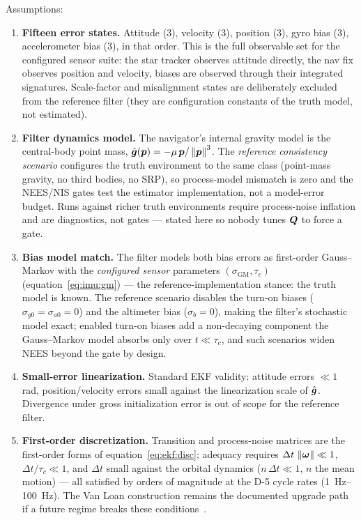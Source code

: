 Assumptions:
\begin{enumerate}
  \item \textbf{Fifteen error states.} Attitude (3), velocity (3),
    position (3), gyro bias (3), accelerometer bias (3), in that order.
    This is the full observable set for the configured sensor suite:
    the star tracker observes attitude directly, the nav fix observes
    position and velocity, biases are observed through their integrated
    signatures. Scale-factor and misalignment states are deliberately
    excluded from the reference filter (they are configuration
    constants of the truth model, not estimated).
  \item \textbf{Filter dynamics model.} The navigator's internal
    gravity model is the central-body point mass,
    $\hat{\bm{g}}(\bm{p}) = -\mu\,\bm{p}/\left\lVert \bm{p} \right\rVert^3$. The
    \emph{reference consistency scenario} configures the truth
    environment to the same class (point-mass gravity, no third bodies,
    no SRP), so process-model mismatch is zero and the NEES/NIS gates
    test the estimator implementation, not a model-error budget. Runs
    against richer truth environments require process-noise inflation
    and are diagnostics, not gates --- stated here so nobody tunes
    $\bm{Q}$ to force a gate.
  \item \textbf{Bias model match.} The filter models both bias errors
    as first-order Gauss--Markov with the \emph{configured sensor}
    parameters $(\sigma_{\mathrm{GM}}, \tau_c)$
    (equation~\eqref{eq:imu:gm}) --- the reference-implementation
    stance: the truth model is known. The reference scenario disables
    the turn-on biases ($\sigma_{g0} = \sigma_{a0} = 0$) and the
    altimeter bias ($\sigma_b = 0$), making the filter's stochastic
    model exact; enabled turn-on biases add a non-decaying component
    the Gauss--Markov model absorbs only over $t \ll \tau_c$, and such
    scenarios widen NEES beyond the gate by design.
  \item \textbf{Small-error linearization.} Standard EKF validity:
    attitude errors $\ll 1$ rad, position/velocity errors small
    against the linearization scale of
    $\hat{\bm{g}}$. Divergence under gross initialization error is
    out of scope for the reference filter.
  \item \textbf{First-order discretization.} Transition and
    process-noise matrices are the first-order forms of
    equation~\eqref{eq:ekf:disc}; adequacy requires
    $\Delta t\,\left\lVert \bm{\omega} \right\rVert \ll 1$,
    $\Delta t / \tau_c \ll 1$, and $\Delta t$ small against the
    orbital dynamics ($n\,\Delta t \ll 1$, $n$ the mean motion) ---
    all satisfied by orders of magnitude at the D-5 cycle rates
    (\qtyrange{1}{100}{\hertz}). The Van Loan construction
    remains the documented upgrade path if a future regime breaks
    these conditions~\cite{vanloan1978}.
\end{enumerate}

